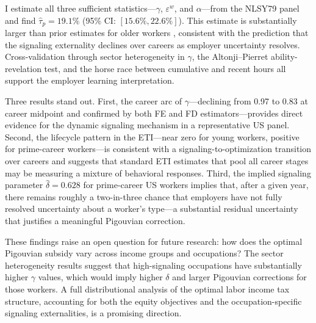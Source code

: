 \documentclass[12pt]{article}
\theoremstyle{definition}
\theoremstyle{remark}
\begin{document}
I estimate all three sufficient statistics---$\gamma$, $\varepsilon^w$, and $\alpha$---from
the NLSY79 panel and find $\hat{\tau}_p = 19.1\%$ (95\% CI: $[15.6\%, 22.6\%]$). This
estimate is substantially larger than prior estimates for older workers \citep{sztutman2024},
consistent with the prediction that the signaling externality declines over careers as
employer uncertainty resolves. Cross-validation through sector heterogeneity in $\gamma$,
the Altonji--Pierret ability-revelation test, and the horse race between cumulative and
recent hours all support the employer learning interpretation.

Three results stand out. First, the career arc of $\gamma$---declining from 0.97 to 0.83
at career midpoint and confirmed by both FE and FD estimators---provides direct evidence
for the dynamic signaling mechanism in a representative US panel. Second, the lifecycle
pattern in the ETI---near zero for young workers, positive for prime-career workers---is
consistent with a signaling-to-optimization transition over careers and suggests that
standard ETI estimates that pool all career stages may be measuring a mixture of behavioral
responses. Third, the implied signaling parameter $\hat{\delta} = 0.628$ for prime-career
US workers implies that, after a given year, there remains roughly a two-in-three chance
that employers have not fully resolved uncertainty about a worker's type---a substantial
residual uncertainty that justifies a meaningful Pigouvian correction.

These findings raise an open question for future research: how does the optimal Pigouvian
subsidy vary across income groups and occupations? The sector heterogeneity results suggest
that high-signaling occupations have substantially higher $\gamma$ values, which would imply
higher $\delta$ and larger Pigouvian corrections for those workers. A full distributional
analysis of the optimal labor income tax structure, accounting for both the equity objectives
and the occupation-specific signaling externalities, is a promising direction.
\end{document}
